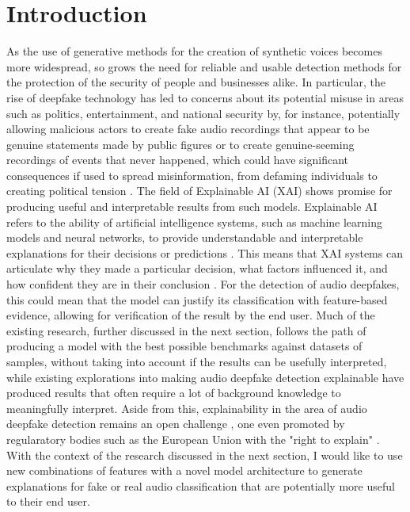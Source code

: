 \documentclass{article}
\begin{document}
    \section{Introduction}
    As the use of generative methods for the creation of synthetic voices becomes more widespread,
    so grows the need for reliable and usable detection methods for the protection of the security
    of people and businesses alike. In particular, the rise of deepfake technology has led to
	concerns about its potential misuse in areas such as politics, entertainment, and national
	security by, for instance, potentially allowing malicious actors to create fake audio
	recordings that appear to be genuine statements made by public figures or to create
	genuine-seeming recordings of events that never happened, which could have significant
	consequences if used to spread misinformation, from defaming individuals to creating political
	tension \cite{veerasamy_rising_2022,albahar_deepfakes_2005}. The field of Explainable AI (XAI)
	shows promise for producing useful and interpretable results from such models. Explainable AI
	refers to the ability of artificial intelligence systems, such as machine learning models and
	neural networks, to provide understandable and interpretable explanations for their decisions
	or predictions \cite{hind_explaining_2019}. This means that XAI systems can articulate why
	they made a particular decision, what factors influenced it, and how confident they are in
	their conclusion \cite{hind_explaining_2019}. For the detection of audio deepfakes, this could
	mean that the model can justify its classification with feature-based evidence, allowing for
	verification of the result by the end user. Much of the existing research, further discussed
	in the next section, follows the path of producing a model with the best possible benchmarks
	against datasets of samples, without taking into account if the results can be usefully
	interpreted, while existing explorations into making audio deepfake detection explainable have
	produced results that often require a lot of background knowledge to meaningfully interpret.
	Aside from this, explainability in the area of audio deepfake detection remains an open
	challenge \cite{cuccovillo_open_2022}, one even promoted by regularatory bodies such as the 
	European Union with the "right to explain" \cite{goodman_european_2017}. With the context of
	the research discussed in the next section, I would like to use new combinations of features
	with a novel model architecture to generate explanations for fake or real audio classification
	that are potentially more useful to their end user.
\end{document}
